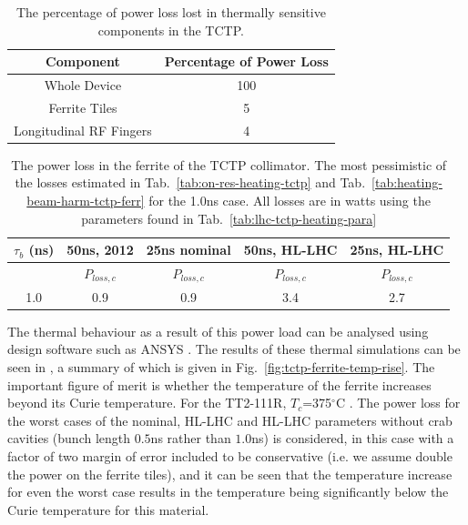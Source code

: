 \begin{table}
\caption{The percentage of power loss lost in thermally sensitive components in the TCTP.}
\label{tab:tctp-heating-loc}
\begin{center}
\begin{tabular}{c | c}
Component & Percentage of Power Loss \\ \hline
Whole Device & 100 \\ \hline
Ferrite Tiles & 5 \\ \hline
Longitudinal RF Fingers & 4 \\
\end{tabular}
\end{center}
\end{table}

\begin{table}
\caption{The power loss in the ferrite of the TCTP collimator. The most pessimistic of the losses estimated in Tab.~\ref{tab:on-res-heating-tctp} and Tab.~\ref{tab:heating-beam-harm-tctp-ferr} for the 1.0ns case. All losses are in watts using the parameters found in Tab.~\ref{tab:lhc-tctp-heating-para}}
\label{tab:heating-ferr-power-load}
\begin{center}
\begin{tabular}{c | c | c | c | c }
$\tau_{b}$ (ns) & 50ns, 2012 & 25ns nominal & 50ns, HL-LHC & 25ns, HL-LHC \\ \hline
 &  $P_{loss, c}$  & $P_{loss, c}$ &  $P_{loss, c}$  & $P_{loss, c}$ \\ \hline
1.0 & 0.9 & 0.9 & 3.4 & 2.7 
\end{tabular}
\end{center}
\end{table}


The thermal behaviour as a result of this power load can be analysed using design software such as ANSYS \cite{ansys}. The results of these thermal simulations can be seen in \cite{Carra:HeatLoad}, a summary of which is given in Fig.~\ref{fig:tctp-ferrite-temp-rise}. The important figure of merit is whether the temperature of the ferrite increases beyond its Curie temperature. For the TT2-111R, $T_{c}$=375$^{\circ}$C \cite{tt2111r:datSheet}. The power loss for the worst cases of the nominal, HL-LHC and HL-LHC parameters without crab cavities (bunch length $0.5$ns rather than $1.0$ns) is considered, in this case with a factor of two margin of error included to be conservative (i.e. we assume double the power on the ferrite tiles), and it can be seen that the temperature increase for even the worst case results in the temperature being significantly below the Curie temperature for this material.

